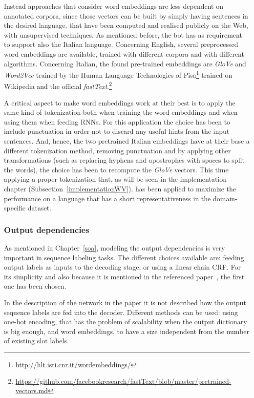 Instead approaches that consider word embeddings are less dependent on annotated corpora, since those vectors can be built by simply having sentences in the desired language, that have been computed and realised publicly on the  Web, with unsupervised techniques. As mentioned before, the bot has as requirement to support also the Italian language. Concerning English,  several preprocessed word embeddings are available, trained with different corpora and with different algorithms. Concerning Italian, the found pre-trained embeddings are \textit{GloVe} and \textit{Word2Vec} trained by the Human Language Technologies of Pisa\footnote{\url{http://hlt.isti.cnr.it/wordembeddings/}} trained on Wikipedia and the official \textit{fastText}.\footnote{\url{https://github.com/facebookresearch/fastText/blob/master/pretrained-vectors.md}}

A critical aspect to make word embeddings work at their best is to apply the same kind of tokenization both when training the word embeddings and when using them when feeding RNNs. For this application the choice has been to include punctuation in order not to discard any useful hints from the input sentences. And, hence, the two pretrained Italian embeddings have at their base a different tokenization method, removing punctuation and by applying other transformations (such as replacing hyphens and apostrophes with spaces to split the words),  the choice has been to recompute the \textit{GloVe} vectors. This time applying a proper tokenization that, as will be seen in the implementation chapter (Subsection~\ref{implementationWV}), has been applied to maximize the performance on a language that has a short representativeness in the domain-specific dataset.

\subsubsection{Output dependencies}
As mentioned in Chapter~\ref{soa}, modeling the output dependencies is very important in sequence labeling tasks. The different choices available are: feeding output labels as inputs to the decoding stage, or using a linear chain CRF. For its simplicity and also because it is mentioned in the referenced paper~\cite{liu2016attention}, the first one has been chosen.

In the description of the network in the paper it is not described how the output sequence labels are fed into the decoder. Different methods can be used: using one-hot encoding, that has the problem of scalability when the output dictionary is big enough, and word embeddings, to have a size independent from the number of existing slot labels.

